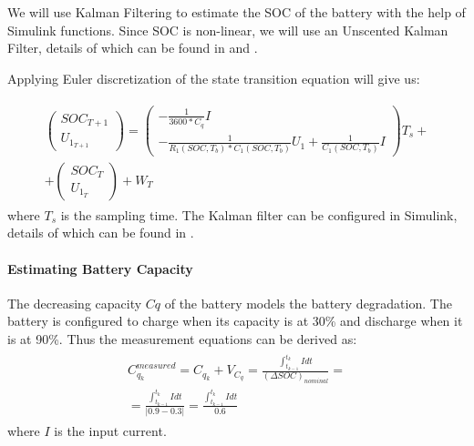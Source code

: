 We will use Kalman Filtering to estimate the SOC of the battery with the help of Simulink functions. Since SOC is non-linear, we will use an Unscented Kalman Filter, details of which can be found in \cite{6183271} and \cite{882463}.

Applying Euler discretization of the state transition equation will give us:

\begin{equation*}
  \label{state transition_2}
\begin{aligned}
\begin{split}
 \left( \begin{array}{c} SOC_{T+1} \\ U_{1_{T+1}}\end{array}\right) = 
 \left( \begin{array}{c} -\frac{1}{3600*C_q}I \\-\frac{1}{R_1(SOC, T_b)*C_1(SOC, T_b)}U_1 + \frac{1}{C_1(SOC, T_b)}I\end{array}\right)T_s + \\
 + \left( \begin{array}{c} SOC_{T} \\ U_{1_{T}}\end{array}\right) + W_T
 \end{split}
 \end{aligned}
\end{equation*}
where $T_s$ is the sampling time.
The Kalman filter can be configured in Simulink, details of which can be found in \cite{6183271}.

\paragraph{Estimating Battery Capacity}
The decreasing capacity $Cq$ of the battery models the battery degradation. The battery is configured to charge when its capacity is at 30\% and discharge when it is at 90\%. Thus the measurement equations can be derived as:
\begin{equation}
  \label{state transition_2}
\begin{aligned}
\begin{split}
 C_{q_k}^{measured} = C_{q_{k}} + V_{C_{q}} =  \frac{\int_{t_{k-1}}^{t_{k}}Idt} {(\Delta SOC)_{nominal}} = \\ = \frac{\int_{t_{k-1}}^{t_{k}}Idt} {\left|0.9 - 0.3 \right|} = \frac{\int_{t_{k-1}}^{t_{k}}Idt} {0.6}
 \end{split}
 \end{aligned}
\end{equation}
where $I$ is the input current.

